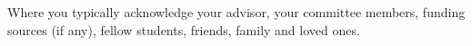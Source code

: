 

Where you typically acknowledge your advisor, your committee members, funding sources (if any), fellow students, friends, family and loved ones.